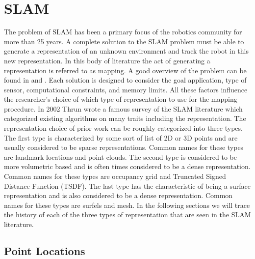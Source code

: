 \section{SLAM}

The problem of SLAM has been a primary focus of the robotics community for
more than 25 years. A complete solution to the SLAM problem must be able to
generate a representation of an unknown environment and track the robot in
this new representation. In this body of literature the act of generating a
representation is referred to as mapping. A good overview of the problem
can be found in \cite{Durrant-Whyte2006} and \cite{Bailey2006}. Each
solution is designed to consider the goal application, type of sensor,
computational constraints, and memory limits. All these factors influence
the researcher's choice of which type of representation to use for the
mapping procedure. In 2002 Thrun wrote a famous survey \cite{Thrun2002} of
the SLAM literature which categorized existing algorithms on many traits
including the representation. The representation choice of prior work can
be roughly categorized into three types. The first type is characterized by
some sort of list of 2D or 3D points and are usually considered to be
sparse representations. Common names for these types are landmark locations
and point clouds. The second type is considered to be more volumetric
based and is often times considered to be a dense representation. Common
names for these types are occupancy grid and Truncated Signed Distance
Function (TSDF). The last type has the characteristic of being a surface
representation and is also considered to be a dense representation. Common
names for these types are surfels and mesh. In the following sections we
will trace the history of each of the three types of representation that are
seen in the SLAM literature.

\subsection{Point Locations}

